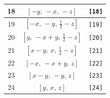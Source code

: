 \documentclass[fleqn,8pt]{jsarticle}
\begin{document}
\begin{longtable}{ccc}
18 & $\left[ - y,\, - x,\, - z \right]$ & {\tt [18]} \\ \hline
19 & $\left[ - x,\, - y,\, \frac{1}{2} - z \right]$ & {\tt [19]} \\ \hline
20 & $\left[ y,\, - x + y,\, \frac{1}{2} - z \right]$ & {\tt [20]} \\ \hline
21 & $\left[ x - y,\, x,\, \frac{1}{2} - z \right]$ & {\tt [21]} \\ \hline
22 & $\left[ - x,\, - x + y,\, z \right]$ & {\tt [22]} \\ \hline
23 & $\left[ x - y,\, - y,\, z \right]$ & {\tt [23]} \\ \hline
24 & $\left[ y,\, x,\, z \right]$ & {\tt [24]} \\
\end{longtable}
\end{document}
